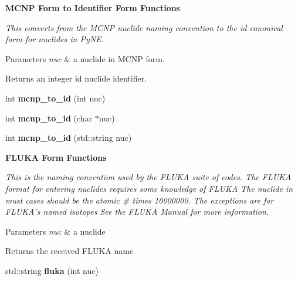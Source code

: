 \begin{Indent}{\bf M\-C\-N\-P Form to Identifier Form Functions}\par
{\em This converts from the M\-C\-N\-P nuclide naming convention to the id canonical form for nuclides in Py\-N\-E. 
\begin{DoxyParams}{Parameters}
{\em nuc} & a nuclide in M\-C\-N\-P form. \\
\hline
\end{DoxyParams}
\begin{DoxyReturn}{Returns}
an integer id nuclide identifier. 
\end{DoxyReturn}
}\begin{DoxyCompactItemize}
\item 
\hypertarget{namespacepyne_1_1nucname_a08a6a5c718cf9f473ec04fea4f3d8136}{int {\bfseries mcnp\-\_\-to\-\_\-id} (int nuc)}\label{namespacepyne_1_1nucname_a08a6a5c718cf9f473ec04fea4f3d8136}

\item 
\hypertarget{namespacepyne_1_1nucname_ad3c98c31ea9887ba2cccc0e5435fe7eb}{int {\bfseries mcnp\-\_\-to\-\_\-id} (char $\ast$nuc)}\label{namespacepyne_1_1nucname_ad3c98c31ea9887ba2cccc0e5435fe7eb}

\item 
\hypertarget{namespacepyne_1_1nucname_a9dfc39f06bbb535cb9df3bc06a1211ff}{int {\bfseries mcnp\-\_\-to\-\_\-id} (std\-::string nuc)}\label{namespacepyne_1_1nucname_a9dfc39f06bbb535cb9df3bc06a1211ff}

\end{DoxyCompactItemize}
\end{Indent}
\begin{Indent}{\bf F\-L\-U\-K\-A Form Functions}\par
{\em This is the naming convention used by the F\-L\-U\-K\-A suite of codes. The F\-L\-U\-K\-A format for entering nuclides requires some knowledge of F\-L\-U\-K\-A The nuclide in must cases should be the atomic \# times 10000000. The exceptions are for F\-L\-U\-K\-A's named isotopes See the F\-L\-U\-K\-A Manual for more information. 
\begin{DoxyParams}{Parameters}
{\em nuc} & a nuclide \\
\hline
\end{DoxyParams}
\begin{DoxyReturn}{Returns}
the received F\-L\-U\-K\-A name 
\end{DoxyReturn}
}\begin{DoxyCompactItemize}
\item 
\hypertarget{namespacepyne_1_1nucname_ac34443f2c05ca8fda7d7993e715a3f5a}{std\-::string {\bfseries fluka} (int nuc)}\label{namespacepyne_1_1nucname_ac34443f2c05ca8fda7d7993e715a3f5a}

\end{DoxyCompactItemize}
\end{Indent}
